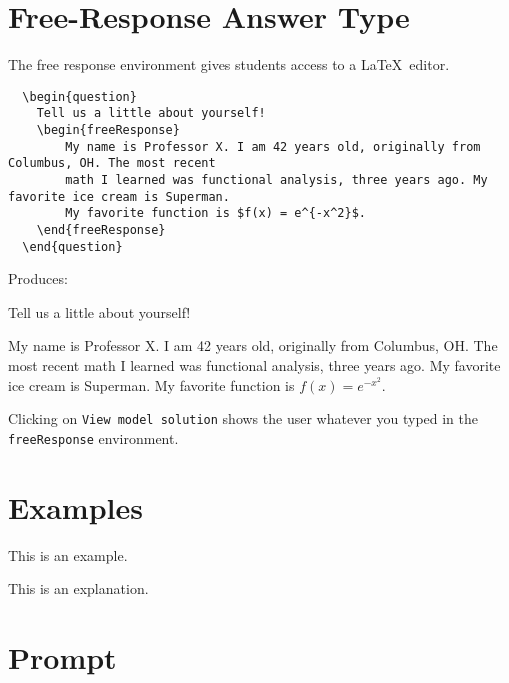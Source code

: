 \documentclass{ximera}
\begin{document}
\section{Free-Response Answer Type}

The free response environment gives students access to a \LaTeX\ editor. 

\begin{verbatim}
  \begin{question}
    Tell us a little about yourself!
    \begin{freeResponse}
        My name is Professor X. I am 42 years old, originally from Columbus, OH. The most recent 
        math I learned was functional analysis, three years ago. My favorite ice cream is Superman. 
        My favorite function is $f(x) = e^{-x^2}$.
    \end{freeResponse}
  \end{question}
\end{verbatim}

Produces:

  \begin{question}
    Tell us a little about yourself!
    \begin{freeResponse}
        My name is Professor X. I am 42 years old, originally from Columbus, OH. The most recent 
        math I learned was functional analysis, three years ago. My favorite ice cream is Superman. 
        My favorite function is $f(x) = e^{-x^2}.$
    \end{freeResponse}
  \end{question}

\begin{remark}
Clicking on \verb!View model solution! shows the user
whatever you typed in the  \verb!freeResponse! environment.
\end{remark}

\section{Examples}

\begin{example}
This is an example.
\end{example}
\begin{explanation}
This is an explanation.
\end{explanation}

\section{Prompt}
\end{document}
